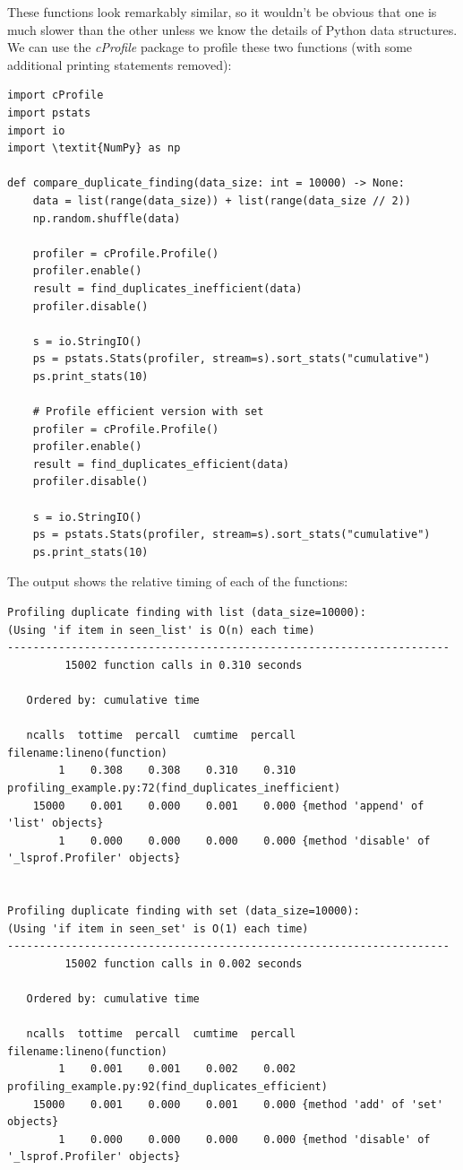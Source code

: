 These functions look remarkably similar, so it wouldn't be obvious that one is much slower than the other unless we know the details of Python data structures.  We can use the \textit{cProfile} package to profile these two functions (with some additional printing statements removed):

\begin{lstlisting}[style=Python]
import cProfile
import pstats
import io
import \textit{NumPy} as np

def compare_duplicate_finding(data_size: int = 10000) -> None:
    data = list(range(data_size)) + list(range(data_size // 2))
    np.random.shuffle(data)
    
    profiler = cProfile.Profile()
    profiler.enable()
    result = find_duplicates_inefficient(data)
    profiler.disable()

    s = io.StringIO()
    ps = pstats.Stats(profiler, stream=s).sort_stats("cumulative")
    ps.print_stats(10)

    # Profile efficient version with set
    profiler = cProfile.Profile()
    profiler.enable()
    result = find_duplicates_efficient(data)
    profiler.disable()

    s = io.StringIO()
    ps = pstats.Stats(profiler, stream=s).sort_stats("cumulative")
    ps.print_stats(10)
\end{lstlisting}

The output shows the relative timing of each of the functions:

\begin{lstlisting}[style=shell]
Profiling duplicate finding with list (data_size=10000):
(Using 'if item in seen_list' is O(n) each time)
---------------------------------------------------------------------
         15002 function calls in 0.310 seconds

   Ordered by: cumulative time

   ncalls  tottime  percall  cumtime  percall filename:lineno(function)
        1    0.308    0.308    0.310    0.310 profiling_example.py:72(find_duplicates_inefficient)
    15000    0.001    0.000    0.001    0.000 {method 'append' of 'list' objects}
        1    0.000    0.000    0.000    0.000 {method 'disable' of '_lsprof.Profiler' objects}


Profiling duplicate finding with set (data_size=10000):
(Using 'if item in seen_set' is O(1) each time)
---------------------------------------------------------------------
         15002 function calls in 0.002 seconds

   Ordered by: cumulative time

   ncalls  tottime  percall  cumtime  percall filename:lineno(function)
        1    0.001    0.001    0.002    0.002 profiling_example.py:92(find_duplicates_efficient)
    15000    0.001    0.000    0.001    0.000 {method 'add' of 'set' objects}
        1    0.000    0.000    0.000    0.000 {method 'disable' of '_lsprof.Profiler' objects}
\end{lstlisting}

